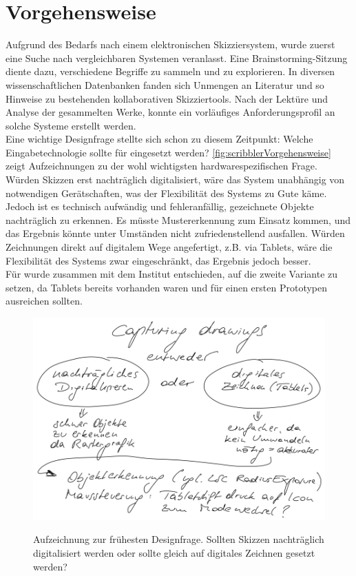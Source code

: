\section{Vorgehensweise}
Aufgrund des Bedarfs nach einem elektronischen Skizziersystem, wurde zuerst eine Suche nach vergleichbaren Systemen veranlasst. Eine Brainstorming-Sitzung diente dazu, verschiedene Begriffe zu sammeln und zu explorieren. In diversen wissenschaftlichen Datenbanken fanden sich Unmengen an Literatur und so Hinweise zu bestehenden kollaborativen Skizziertools. Nach der Lektüre und Analyse der gesammelten Werke, konnte ein vorläufiges Anforderungsprofil an solche Systeme erstellt werden. \\
Eine wichtige Designfrage stellte sich schon zu diesem Zeitpunkt: Welche Eingabetechnologie sollte für \scribbler eingesetzt werden? \autoref{fig:scribblerVorgehensweise} zeigt Aufzeichnungen zu der wohl wichtigsten hardwarespezifischen Frage. Würden Skizzen erst nachträglich digitalisiert, wäre das System unabhängig von notwendigen Gerätschaften, was der Flexibilität des Systems zu Gute käme. Jedoch ist es technisch aufwändig und fehleranfällig, gezeichnete Objekte nachträglich zu erkennen. Es müsste Mustererkennung zum Einsatz kommen, und das Ergebnis könnte unter Umständen nicht zufriedenstellend ausfallen. Würden Zeichnungen direkt auf digitalem Wege angefertigt, z.B. via Tablets, wäre die Flexibilität des Systems zwar eingeschränkt, das Ergebnis jedoch besser. \\
Für \scribbler wurde zusammen mit dem Institut entschieden, auf die zweite Variante zu setzen, da Tablets bereits vorhanden waren und für einen ersten Prototypen ausreichen sollten.

\begin{figure}
	        {\includegraphics[width=1\linewidth]{gfx/scribblerVorgehensweise}}
		\caption[Aufzeichnung zur frühesten Designfrage]{Aufzeichnung zur frühesten Designfrage. Sollten Skizzen nachträglich digitalisiert werden oder sollte gleich auf digitales Zeichnen gesetzt werden?}\label{fig:scribblerVorgehensweise}
\end{figure}

